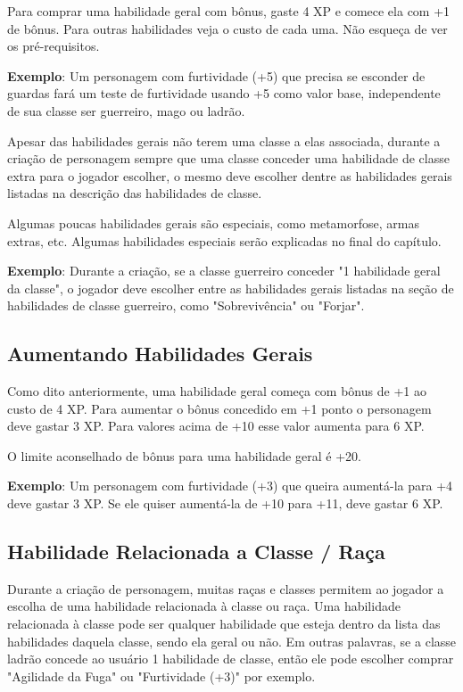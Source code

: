 Para comprar uma habilidade geral com bônus, gaste 4 XP e comece ela com +1 de bônus. Para outras habilidades veja o custo de cada uma. Não esqueça de ver os pré-requisitos.

\textbf{Exemplo}: Um personagem com furtividade (+5) que precisa se esconder de guardas fará um teste de furtividade usando +5 como valor base, independente de sua classe ser guerreiro, mago ou ladrão.

Apesar das habilidades gerais não terem uma classe a elas associada, durante a criação de personagem sempre que uma classe conceder uma habilidade de classe extra para o jogador escolher, o mesmo deve escolher dentre as habilidades gerais listadas na descrição das habilidades de classe.

Algumas poucas habilidades gerais são especiais, como metamorfose, armas extras, etc. Algumas habilidades especiais serão explicadas no final do capítulo.

\textbf{Exemplo}: Durante a criação, se a classe guerreiro conceder "1 habilidade geral da classe", o jogador deve escolher entre as habilidades gerais listadas na seção de habilidades de classe guerreiro, como "Sobrevivência" ou "Forjar".


\subsection{Aumentando Habilidades Gerais}

Como dito anteriormente, uma habilidade geral começa com bônus de +1 ao custo de 4 XP. Para aumentar o bônus concedido em +1 ponto o personagem deve gastar 3 XP. Para valores acima de +10 esse valor aumenta para 6 XP.

O limite aconselhado de bônus para uma habilidade geral é +20.

\textbf{Exemplo}: Um personagem com furtividade (+3) que queira aumentá-la para +4 deve gastar 3 XP. Se ele quiser aumentá-la de +10 para +11, deve gastar 6 XP.

\subsection{Habilidade Relacionada a Classe / Raça}
 
Durante a criação de personagem, muitas raças e classes permitem ao jogador a escolha de uma habilidade relacionada à classe ou raça. Uma habilidade relacionada à classe pode ser qualquer habilidade que esteja dentro da lista das habilidades daquela classe, sendo ela geral ou não. Em outras palavras, se a classe ladrão concede ao usuário 1 habilidade de classe, então ele pode escolher comprar "Agilidade da Fuga" ou "Furtividade (+3)" por exemplo.

